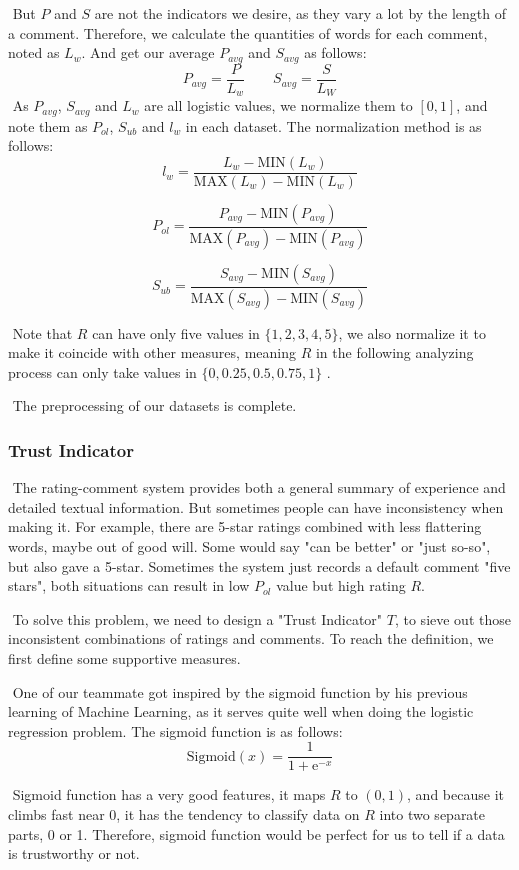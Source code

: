 \documentclass[12pt]{article}  %
\begin{document}
​		But $P$ and $S$ are not the indicators we desire, as they vary a lot by the length of a comment. Therefore, we calculate the quantities of words for each comment, noted as $L_{w}$. And get our average $P_{avg}$ and $S_{avg}$ as follows:
$$
P_{avg} = \frac{P}{L_{w}}
\quad\quad
S_{avg} = \frac{S}{L_{W}}
$$
​		As  $P_{avg}$, $S_{avg}$ and $L_{w}$ are all logistic values, we normalize them to $[0,1]$, and note them as $P_{ol}$,  $S_{ub}$ and $l_{w}$ in each dataset. The normalization method is as follows:
$$
l_{w} = \frac{L_{w} - \mathrm{MIN}(L_{w})}{\mathrm{MAX}(L_{w}) - \mathrm{MIN}(L_{w})}
$$

$$
P_{ol} = \frac{P_{avg} - \mathrm{MIN}(P_{avg})}{\mathrm{MAX}(P_{avg}) - \mathrm{MIN}(P_{avg})}
$$

$$
S_{ub} = \frac{S_{avg} - \mathrm{MIN}(S_{avg})}{\mathrm{MAX}(S_{avg}) - \mathrm{MIN}(S_{avg})}
$$

​		Note that $R$ can have only five values in $\{1,2,3,4,5\}$, we also normalize it to make it coincide with other measures, meaning $R$ in the following analyzing process can only take values in $\{0,0.25,0.5,0.75,1\}$ .

​		The preprocessing of our datasets is complete.

\subsubsection{Trust Indicator}

​		The rating-comment system provides both a general summary of experience and detailed textual information. But sometimes people can have inconsistency when making it. For example, there are 5-star ratings combined with less flattering words, maybe out of good will. Some would say "can be better" or "just so-so", but also gave a 5-star. Sometimes the system just records a default comment "five stars", both situations can result in low $P_{ol}$ value but high rating $R$.

​		To solve this problem, we need to design a "Trust Indicator" $T$, to sieve out those inconsistent combinations of ratings and comments. To reach the definition, we first define some supportive measures.

​		One of our teammate got inspired by the sigmoid function by his previous learning of Machine Learning, as it serves quite well when doing the logistic regression problem. The sigmoid function is as follows:
$$
\mathrm{Sigmoid}(x) = \frac{1}{1+\mathrm{e}^{-x}}
$$


​		Sigmoid function has a very good features, it maps $R$ to $(0,1)$, and because it climbs fast near 0, it has the tendency to classify data on $R$ into two separate parts, 0 or 1. Therefore, sigmoid function would be perfect for us to tell if a data is trustworthy or not.
\end{document}
